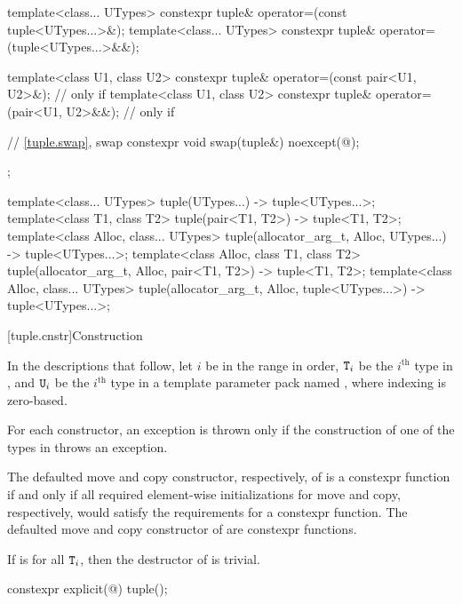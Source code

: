 \begin{codeblock}
{{    template<class... UTypes>
      constexpr tuple& operator=(const tuple<UTypes...>&);
    template<class... UTypes>
      constexpr tuple& operator=(tuple<UTypes...>&&);

    template<class U1, class U2>
      constexpr tuple& operator=(const pair<U1, U2>&);          // only if 
    template<class U1, class U2>
      constexpr tuple& operator=(pair<U1, U2>&&);               // only if 

    // \ref{tuple.swap},  swap
    constexpr void swap(tuple&) noexcept(@\seebelow@);
  };

  template<class... UTypes>
    tuple(UTypes...) -> tuple<UTypes...>;
  template<class T1, class T2>
    tuple(pair<T1, T2>) -> tuple<T1, T2>;
  template<class Alloc, class... UTypes>
    tuple(allocator_arg_t, Alloc, UTypes...) -> tuple<UTypes...>;
  template<class Alloc, class T1, class T2>
    tuple(allocator_arg_t, Alloc, pair<T1, T2>) -> tuple<T1, T2>;
  template<class Alloc, class... UTypes>
    tuple(allocator_arg_t, Alloc, tuple<UTypes...>) -> tuple<UTypes...>;
}
\end{codeblock}

[tuple.cnstr]{Construction}

\pnum
In the descriptions that follow, let $i$ be in the range
 in order, $\texttt{T}_i$
be the $i^\text{th}$ type in , and
$\texttt{U}_i$ be the $i^\text{th}$ type in a template parameter pack named , where indexing
is zero-based.

\pnum
For each  constructor, an exception is thrown only if the construction of
one of the types in  throws an exception.

\pnum
The defaulted move and copy constructor, respectively, of
 is a constexpr function if and only if all
required element-wise initializations for move and copy, respectively,
would satisfy the requirements for a constexpr function. The
defaulted move and copy constructor of  are
constexpr functions.

\pnum
If  is  for all $\texttt{T}_i$,
then the destructor of  is trivial.

%
\begin{itemdecl}
constexpr explicit(@\seebelow@) tuple();
\end{itemdecl}

